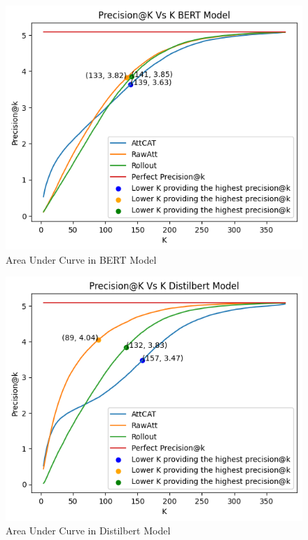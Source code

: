 \newpage

\begin{figure}[H]
    \centering%
    \includegraphics[width=0.75\linewidth]{Figures/Experimental Setup/Codo_BERT_VMRC.png}
    \caption{Area Under Curve in BERT Model}
    \label{fig:aucbert}
\end{figure}

\begin{figure}[H]
    \centering%
    \includegraphics[width=0.75\linewidth]{Figures/Experimental Setup/Codo_Distilbert_VMRC.png}
    \caption{Area Under Curve in Distilbert Model}
    \label{fig:aucdistilbert}
\end{figure}

